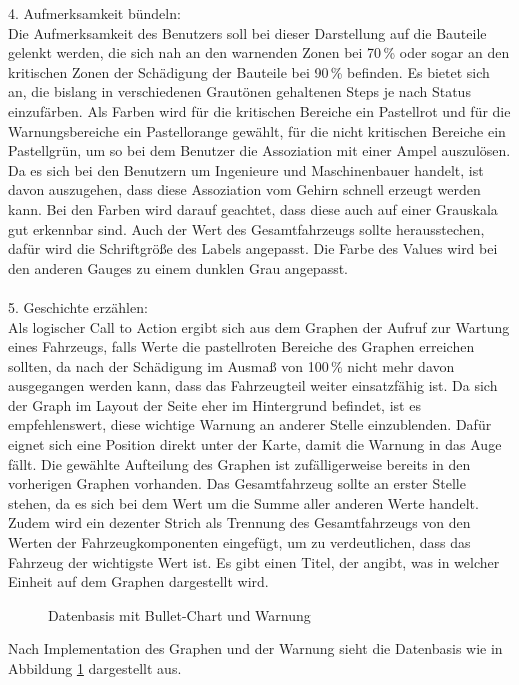 4. Aufmerksamkeit bündeln:\\
Die Aufmerksamkeit des Benutzers soll bei dieser Darstellung auf die Bauteile gelenkt werden, die sich nah an den warnenden Zonen bei 70\,\% oder sogar an den kritischen Zonen der Schädigung der Bauteile bei 90\,\% befinden. Es bietet sich an, die bislang in verschiedenen Grautönen gehaltenen Steps je nach Status einzufärben. Als Farben wird für die kritischen Bereiche ein Pastellrot und für die Warnungsbereiche ein Pastellorange gewählt, für die nicht kritischen Bereiche ein Pastellgrün, um so bei dem Benutzer die Assoziation mit einer Ampel auszulösen. Da es sich bei den Benutzern um Ingenieure und Maschinenbauer handelt, ist davon auszugehen, dass diese Assoziation vom Gehirn schnell erzeugt werden kann. Bei den Farben wird darauf geachtet, dass diese auch auf einer Grauskala gut erkennbar sind. Auch der Wert des Gesamtfahrzeugs sollte herausstechen, dafür wird die Schriftgröße des Labels angepasst. Die Farbe des Values wird bei den anderen Gauges zu einem dunklen Grau angepasst.\\\\
5. Geschichte erzählen:\\
Als logischer Call to Action ergibt sich aus dem Graphen der Aufruf zur Wartung eines Fahrzeugs, falls Werte die pastellroten Bereiche des Graphen erreichen sollten, da nach der Schädigung im Ausmaß von 100\,\% nicht mehr davon ausgegangen werden kann, dass das Fahrzeugteil weiter einsatzfähig ist. Da sich der Graph im Layout der Seite eher im Hintergrund befindet, ist es empfehlenswert, diese wichtige Warnung an anderer Stelle einzublenden. Dafür eignet sich eine Position direkt unter der Karte, damit die Warnung in das Auge fällt. Die gewählte Aufteilung des Graphen ist zufälligerweise bereits in den vorherigen Graphen vorhanden. Das Gesamtfahrzeug sollte an erster Stelle stehen, da es sich bei dem Wert um die Summe aller anderen Werte handelt. Zudem wird ein dezenter Strich als Trennung des Gesamtfahrzeugs von den Werten der Fahrzeugkomponenten eingefügt, um zu verdeutlichen, dass das Fahrzeug der wichtigste Wert ist. Es gibt einen Titel, der angibt, was in welcher Einheit auf dem Graphen dargestellt wird.
\begin{figure}[h!]
\centering
{}
\caption{Datenbasis mit Bullet-Chart und Warnung}
\label{fig:datenbasis_after}
\end{figure}
\noindent
Nach Implementation des Graphen und der Warnung sieht die Datenbasis wie  in Abbildung \ref{fig:datenbasis_after} dargestellt aus.

